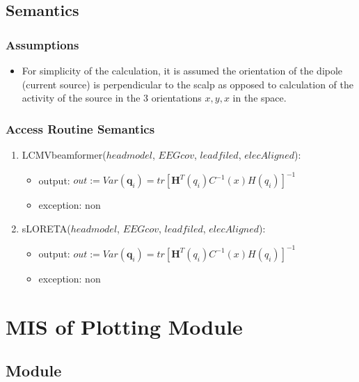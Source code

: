 \documentclass[12pt, titlepage]{article}
\begin{document}
\subsection{Semantics}

\subsubsection{Assumptions}
\begin{itemize}
\item For simplicity of the calculation, it is assumed the orientation of the dipole (current source) is perpendicular to the scalp as opposed to calculation of the activity of the source in the 3 orientations $x,y,x$ in the space. 

\end{itemize}

\subsubsection{Access Routine Semantics}
\begin{enumerate}

\item LCMVbeamformer($headmodel$, $EEGcov$, $leadfiled$, $elecAligned$):
\begin{itemize}
\item output: $out := Var(\mathbf q_i) = tr{[\mathbf H^T(q_i) C^{-1}(x) H(q_i)]^{-1}}$
\item exception: non
\end{itemize}

\item sLORETA($headmodel$, $EEGcov$, $leadfiled$, $elecAligned$):
\begin{itemize}
\item output: $out := Var(\mathbf q_i) = tr{[\mathbf H^T(q_i) C^{-1}(x) H(q_i)]^{-1}}$
\item exception: non
\end{itemize}
\end{enumerate}

\newpage
\section{MIS of Plotting Module} \label{Plot}

\subsection{Module}
\end{document}
